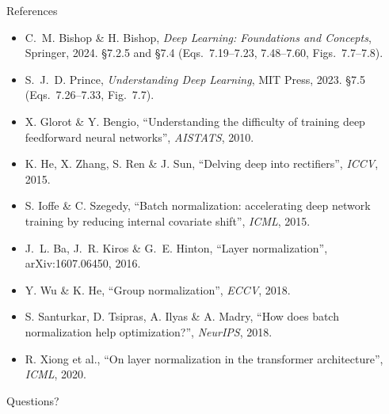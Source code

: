 \documentclass[aspectratio=169, 11pt]{beamer}
\begin{document}
\begin{frame}{References}
  \vspace{0.2em}
  {\scriptsize
  \begin{itemize}\itemsep0.26em
    \item C.~M. Bishop \& H. Bishop, \emph{Deep Learning: Foundations
          and Concepts}, Springer, 2024. \S7.2.5 and \S7.4
          (Eqs.~7.19--7.23, 7.48--7.60, Figs.~7.7--7.8).
    \item S.~J.~D. Prince, \emph{Understanding Deep Learning}, MIT
          Press, 2023. \S7.5 (Eqs.~7.26--7.33, Fig.~7.7).
    \item X. Glorot \& Y. Bengio, ``Understanding the difficulty of
          training deep feedforward neural networks'',
          \emph{AISTATS}, 2010.
    \item K. He, X. Zhang, S. Ren \& J. Sun, ``Delving deep into
          rectifiers'', \emph{ICCV}, 2015.
    \item S. Ioffe \& C. Szegedy, ``Batch normalization: accelerating
          deep network training by reducing internal covariate shift'',
          \emph{ICML}, 2015.
    \item J.~L. Ba, J.~R. Kiros \& G.~E. Hinton, ``Layer
          normalization'', arXiv:1607.06450, 2016.
    \item Y. Wu \& K. He, ``Group normalization'', \emph{ECCV}, 2018.
    \item S. Santurkar, D. Tsipras, A. Ilyas \& A. Madry, ``How does
          batch normalization help optimization?'',
          \emph{NeurIPS}, 2018.
    \item R. Xiong et al., ``On layer normalization in the transformer
          architecture'', \emph{ICML}, 2020.
  \end{itemize}}
\end{frame}

\begin{frame}[standout]
  Questions?
\end{frame}
\end{document}

